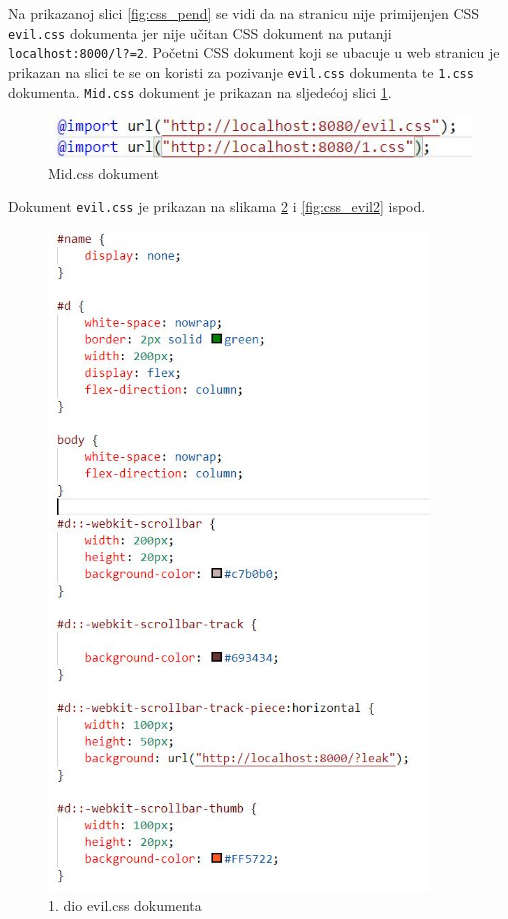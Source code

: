 \documentclass[12pt, oneside, onecolumn]{book}
\begin{document}
{Na prikazanoj slici \ref{fig:css_pend} se vidi da na stranicu nije primijenjen CSS \texttt{evil.css} dokumenta jer nije učitan CSS dokument na putanji \texttt{localhost:8000/l?=2}. Početni CSS dokument koji se ubacuje u web stranicu je prikazan na slici te se on koristi za pozivanje \texttt{evil.css} dokumenta te \texttt{1.css} dokumenta. \texttt{Mid.css} dokument je prikazan na sljedećoj slici \ref{fig:css_midc}. 

\begin{figure}[H]
	\begin{center}
		\includegraphics[width=\textwidth]{css_midc.jpg}
		\caption{Mid.css dokument} \label{fig:css_midc}
	\end{center}
\end{figure}

Dokument \texttt{evil.css} je prikazan na slikama \ref{fig:css_evil} i \ref{fig:css_evil2} ispod.

\begin{figure}[H]
	\begin{center}
		\includegraphics[width=0.9\textwidth]{css_evil.jpg}
		\caption{1. dio evil.css dokumenta} \label{fig:css_evil}
	\end{center}
\end{figure}

}
\end{document}
